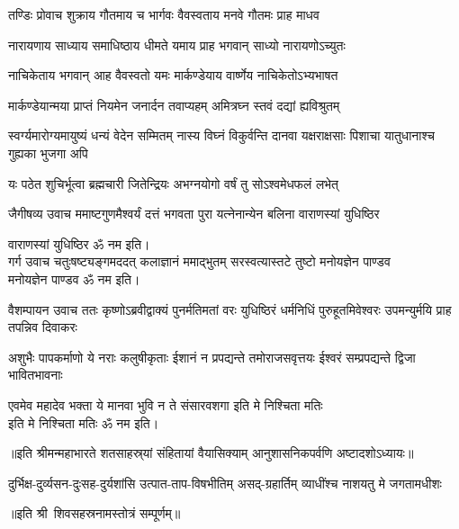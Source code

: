 \twolineshloka
{तण्डिः प्रोवाच शुक्राय गौतमाय च भार्गवः}%
{वैवस्वताय मनवे गौतमः प्राह माधव}%

\twolineshloka
{नारायणाय साध्याय समाधिष्ठाय धीमते}%
{यमाय प्राह भगवान् साध्यो नारायणोऽच्युतः}%

\twolineshloka
{नाचिकेताय भगवान् आह वैवस्वतो यमः}%
{मार्कण्डेयाय वार्ष्णेय नाचिकेतोऽभ्यभाषत}%

\twolineshloka
{मार्कण्डेयान्मया प्राप्तं नियमेन जनार्दन}%
{तवाप्यहम् अमित्रघ्न स्तवं दद्यां ह्यविश्रुतम्}%



\threelineshloka
{स्वर्ग्यमारोग्यमायुष्यं धन्यं वेदेन सम्मितम्}
{नास्य विघ्नं विकुर्वन्ति दानवा यक्षराक्षसाः}%
{पिशाचा यातुधानाश्च गुह्यका भुजगा अपि}%

\twolineshloka
{यः पठेत शुचिर्भूत्वा ब्रह्मचारी जितेन्द्रियः}%
{अभग्नयोगो वर्षं तु सोऽश्वमेधफलं लभेत्}%

जैगीषव्य उवाच\nopagebreak[4]
\twolineshloka
{ममाष्टगुणमैश्वर्यं दत्तं भगवता पुरा}%
{यत्नेनान्येन बलिना वाराणस्यां युधिष्ठिर}%

वाराणस्यां युधिष्ठिर ॐ नम इति।\\

\newpage
गर्ग उवाच\nopagebreak[4]
\twolineshloka
{चतुःषष्ट्यङ्गमददत् कलाज्ञानं ममाद्भुतम्}%
{सरस्वत्यास्तटे तुष्टो मनोयज्ञेन पाण्डव}\mbox{}\\[-1.6em]%
मनोयज्ञेन पाण्डव ॐ नम इति।

वैशम्पायन उवाच\nopagebreak[4]
\threelineshloka
{ततः कृष्णोऽब्रवीद्वाक्यं पुनर्मतिमतां वरः}
{युधिष्ठिरं धर्मनिधिं पुरुहूतमिवेश्वरः}%
{उपमन्युर्मयि प्राह तपन्निव दिवाकरः}%

\threelineshloka
{अशुभैः पापकर्माणो ये नराः कलुषीकृताः}
{ईशानं न प्रपद्यन्ते तमोराजसवृत्तयः}%
{ईश्वरं सम्प्रपद्यन्ते द्विजा भावितभावनाः}%


\twolineshloka
{एवमेव महादेव भक्ता ये मानवा भुवि}%
{न ते संसारवशगा इति मे निश्चिता मतिः}\mbox{}\\[-1.6em]%
इति मे निश्चिता मतिः ॐ नम इति।

॥इति श्रीमन्महाभारते शतसाहस्र्यां संहितायां वैयासिक्याम् आनुशासनिकपर्वणि अष्टादशोऽध्यायः॥

{दुर्भिक्ष-दुर्व्यसन-दुःसह-दुर्यशांसि}
{उत्पात-ताप-विषभीतिम् असद्‌-ग्रहार्तिम्}
{व्याधींश्च नाशयतु मे जगतामधीशः}

॥इति श्री~शिवसहस्रनामस्तोत्रं सम्पूर्णम्॥